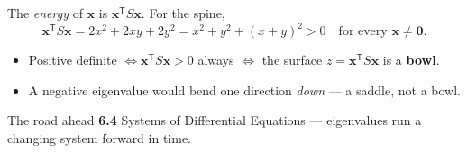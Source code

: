 \documentclass[aspectratio=169, 11pt]{beamer}
\newcommand{\xx}{\mathbf{x}}
\newcommand{\zero}{\mathbf{0}}
\newcommand{\T}{\mathsf{T}}
\begin{document}
\begin{frame}[t, plain]
  The \emph{energy} of $\xx$ is $\xx^{\T}S\xx$. For the spine,
  \[ \xx^{\T}S\xx = 2x^2+2xy+2y^2 = x^2+y^2+(x+y)^2 > 0 \quad\text{for every }\xx\ne\zero. \]
  \begin{itemize}
    \setlength{\itemsep}{5pt}
    \item Positive definite $\iff \xx^{\T}S\xx>0$ always $\iff$ the surface $z=\xx^{\T}S\xx$ is a \textbf{bowl}.
    \item A negative eigenvalue would bend one direction \emph{down} --- a saddle, not a bowl.
  \end{itemize}
  \begin{block}{The road ahead}
    \textbf{6.4} Systems of Differential Equations --- eigenvalues run a changing system forward in time.
  \end{block}
\end{frame}
\end{document}

